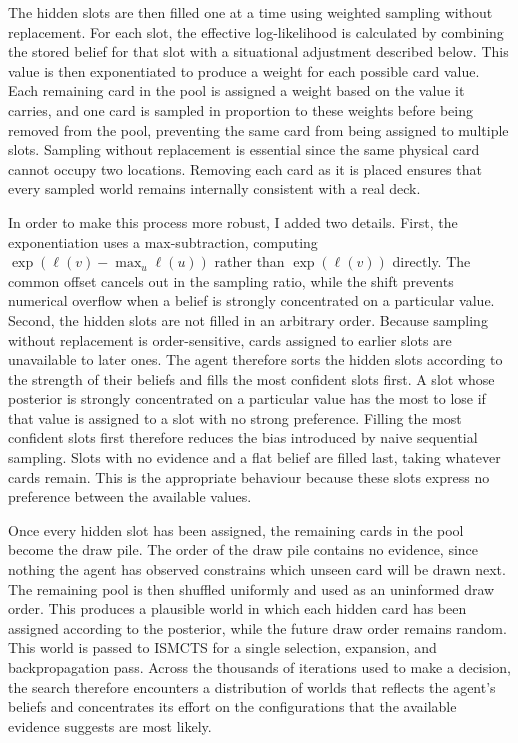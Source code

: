 \documentclass[12pt,a4paper,oneside]{report}
\begin{document}
The hidden slots are then filled one at a time using weighted sampling without replacement. For each slot, the effective log-likelihood is calculated by combining the stored belief for that slot with a situational adjustment described below. This value is then exponentiated to produce a weight for each possible card value. Each remaining card in the pool is assigned a weight based on the value it carries, and one card is sampled in proportion to these weights before being removed from the pool, preventing the same card from being assigned to multiple slots. Sampling without replacement is essential since the same physical card cannot occupy two locations. Removing each card as it is placed ensures that every sampled world remains internally consistent with a real deck.
 
In order to make this process more robust, I added two details. First, the exponentiation uses a max-subtraction, computing $\exp(\ell(v) - \max_u \ell(u))$ rather than $\exp(\ell(v))$ directly. The common offset cancels out in the sampling ratio, while the shift prevents numerical overflow when a belief is strongly concentrated on a particular value. Second, the hidden slots are not filled in an arbitrary order. Because sampling without replacement is order-sensitive, cards assigned to earlier slots are unavailable to later ones. The agent therefore sorts the hidden slots according to the strength of their beliefs and fills the most confident slots first. A slot whose posterior is strongly concentrated on a particular value has the most to lose if that value is assigned to a slot with no strong preference. Filling the most confident slots first therefore reduces the bias introduced by naive sequential sampling. Slots with no evidence and a flat belief are filled last, taking whatever cards remain. This is the appropriate behaviour because these slots express no preference between the available values.

 
Once every hidden slot has been assigned, the remaining cards in the pool become the draw pile. The order of the draw pile contains no evidence, since nothing the agent has observed constrains which unseen card will be drawn next. The remaining pool is then shuffled uniformly and used as an uninformed draw order. This produces a plausible world in which each hidden card has been assigned according to the posterior, while the future draw order remains random. This world is passed to ISMCTS for a single selection, expansion, and backpropagation pass. Across the thousands of iterations used to make a decision, the search therefore encounters a distribution of worlds that reflects the agent’s beliefs and concentrates its effort on the configurations that the available evidence suggests are most likely.
 
\end{document}
